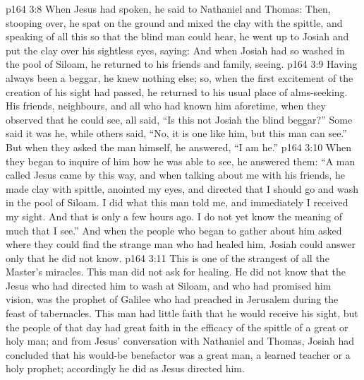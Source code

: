 \vs p164 3:8 When Jesus had spoken, he said to Nathaniel and Thomas:  Then, stooping over, he spat on the ground and mixed the clay with the spittle, and speaking of all this so that the blind man could hear, he went up to Josiah and put the clay over his sightless eyes, saying:  And when Josiah had so washed in the pool of Siloam, he returned to his friends and family, seeing.
\vs p164 3:9 Having always been a beggar, he knew nothing else; so, when the first excitement of the creation of his sight had passed, he returned to his usual place of alms\hyp{}seeking. His friends, neighbours, and all who had known him aforetime, when they observed that he could see, all said, “Is this not Josiah the blind beggar?” Some said it was he, while others said, “No, it is one like him, but this man can see.” But when they asked the man himself, he answered, “I am he.”
\vs p164 3:10 When they began to inquire of him how he was able to see, he answered them: “A man called Jesus came by this way, and when talking about me with his friends, he made clay with spittle, anointed my eyes, and directed that I should go and wash in the pool of Siloam. I did what this man told me, and immediately I received my sight. And that is only a few hours ago. I do not yet know the meaning of much that I see.” And when the people who began to gather about him asked where they could find the strange man who had healed him, Josiah could answer only that he did not know.
\vs p164 3:11 \pc This is one of the strangest of all the Master’s miracles. This man did not ask for healing. He did not know that the Jesus who had directed him to wash at Siloam, and who had promised him vision, was the prophet of Galilee who had preached in Jerusalem during the feast of tabernacles. This man had little faith that he would receive his sight, but the people of that day had great faith in the efficacy of the spittle of a great or holy man; and from Jesus’ conversation with Nathaniel and Thomas, Josiah had concluded that his would\hyp{}be benefactor was a great man, a learned teacher or a holy prophet; accordingly he did as Jesus directed him.
